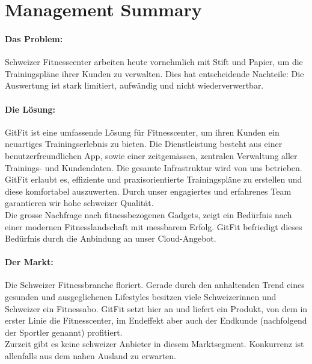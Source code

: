 

\newcommand{\SUBJECT}{Businessplan}
\newcommand{\TITLE}{GitFit}





\cleardoublepage

\section{Management Summary}

\pagestyle{headings}

\paragraph{Das Problem:}
Schweizer Fitnesscenter arbeiten heute vornehmlich mit Stift und Papier, um die Trainingspläne ihrer Kunden zu verwalten. Dies hat entscheidende Nachteile: Die Auswertung ist stark limitiert, aufwändig und nicht wiederverwertbar.

\paragraph{Die Lösung:}
GitFit ist eine umfassende Lösung für Fitnesscenter, um ihren Kunden ein neuartiges Trainingserlebnis zu bieten. Die Dienstleistung besteht aus einer benutzerfreundlichen App, sowie einer zeitgemässen, zentralen Verwaltung aller Trainings- und Kundendaten. Die gesamte Infrastruktur wird von uns betrieben. GitFit erlaubt es, effiziente und praxisorientierte Trainingspläne zu erstellen und diese komfortabel auszuwerten.  Durch unser engagiertes und erfahrenes Team garantieren wir hohe schweizer Qualität. \\
Die grosse Nachfrage nach fitnessbezogenen Gadgets, zeigt ein Bedürfnis nach einer modernen Fitnesslandschaft mit messbarem Erfolg. GitFit befriedigt dieses Bedürfnis durch die Anbindung an unser Cloud-Angebot.

\paragraph{Der Markt:}
Die Schweizer Fitnessbranche floriert. Gerade durch den anhaltenden Trend eines gesunden und ausgeglichenen Lifestyles besitzen viele Schweizerinnen und Schweizer ein Fitnessabo. GitFit setzt hier an und liefert ein Produkt, von dem in erster Linie die Fitnesscenter, im Endeffekt aber auch der Endkunde (nachfolgend der Sportler genannt) profitiert. \\
\noindent Zurzeit gibt es keine schweizer Anbieter in diesem Marktsegment. Konkurrenz ist allenfalls aus dem nahen Ausland zu erwarten.

